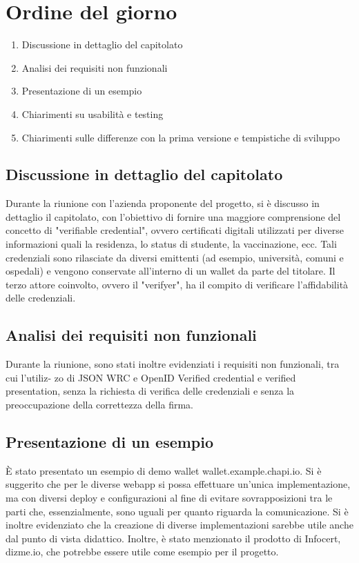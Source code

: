 \section{Ordine del giorno}
\begin{enumerate}
\item Discussione in dettaglio del capitolato
\item Analisi dei requisiti non funzionali
\item Presentazione di un esempio
\item Chiarimenti su usabilità e testing
\item Chiarimenti sulle differenze con la prima versione e tempistiche di sviluppo
\end{enumerate}

\subsection{Discussione in dettaglio del capitolato}
Durante la riunione con l’azienda proponente del progetto, si è discusso in dettaglio il
capitolato, con l’obiettivo di fornire una maggiore comprensione del concetto di "verifiable
credential", ovvero certificati digitali utilizzati per diverse informazioni quali la residenza,
lo status di studente, la vaccinazione, ecc. Tali credenziali sono rilasciate da diversi
emittenti (ad esempio, università, comuni e ospedali) e vengono conservate all’interno di
un wallet da parte del titolare. Il terzo attore coinvolto, ovvero il "verifyer", ha il compito
di verificare l’affidabilità delle credenziali.

\subsection{Analisi dei requisiti non funzionali}
Durante la riunione, sono stati inoltre evidenziati i requisiti non funzionali, tra cui l’utiliz-
zo di JSON WRC e OpenID Verified credential e verified presentation, senza la richiesta
di verifica delle credenziali e senza la preoccupazione della correttezza della firma.

\subsection{Presentazione di un esempio}
È stato presentato un esempio di demo wallet wallet.example.chapi.io. Si è suggerito
che per le diverse webapp si possa effettuare un’unica implementazione, ma con diversi
deploy e configurazioni al fine di evitare sovrapposizioni tra le parti che, essenzialmente,
sono uguali per quanto riguarda la comunicazione. Si è inoltre evidenziato che la creazione
di diverse implementazioni sarebbe utile anche dal punto di vista didattico. Inoltre, è stato
menzionato il prodotto di Infocert, dizme.io, che potrebbe essere utile come esempio per
il progetto.

